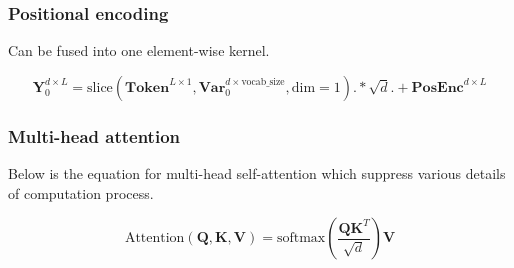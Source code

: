 \subsubsection {Positional encoding}

Can be fused into one element-wise kernel.

$$\mathbf{Y}_0^{d\times L}=\text{slice}(\mathbf{Token}^{L \times1}, \mathbf{Var}_{0}^{d\times \text{vocab\_size}}, \text{dim}=1) .* \sqrt{d} .+ \mathbf{PosEnc}^{d\times L}$$

\subsubsection{Multi-head attention}

Below is the equation for multi-head self-attention which suppress various details of computation process.

\begin{equation}
  \text{Attention}(\mathbf{Q},\mathbf{K},\mathbf{V}) =
  \text{softmax}(\frac{\mathbf{Q}\mathbf{K}^T}{\sqrt{d}})\mathbf{V} \label{eq1}
\end{equation}

